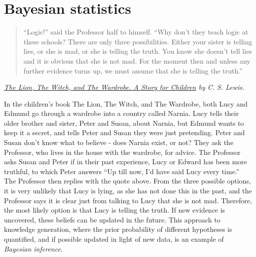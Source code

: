 \documentclass[
]{krantz}
\begin{document}
\hypertarget{bayes}{%
\chapter{Bayesian statistics}\label{bayes}}

\begin{quote}
``Logic!'' said the Professor half to himself. ``Why don't they teach logic at these schools? There are only three possibilities. Either your sister is telling lies, or she is mad, or she is telling the truth. You know she doesn't tell lies and it is obvious that she is not mad. For the moment then and unless any further evidence turns up, we must assume that she is telling the truth.''
\end{quote}

\emph{\href{https://gutenberg.ca/ebooks/lewiscs-thelionthewitchandthewardrobe/lewiscs-thelionthewitchandthewardrobe-00-h.html}{The Lion, The Witch, and The Wardrobe. A Story for Children} by C. S. Lewis.}

In the children's book The Lion, The Witch, and The Wardrobe, both Lucy and Edmund go through a wardrobe into a country called Narnia. Lucy tells their older brother and sister, Peter and Susan, about Narnia, but Edmund wants to keep it a secret, and tells Peter and Susan they were just pretending. Peter and Susan don't know what to believe - does Narnia exist, or not? They ask the Professor, who lives in the house with the wardrobe, for advice. The Professor asks Susan and Peter if in their past experience, Lucy or Edward has been more truthful, to which Peter answers ``Up till now, I'd have said Lucy every time.'' The Professor then replies with the quote above. From the three possible options, it is very unlikely that Lucy is lying, as she has not done this in the past, and the Professor says it is clear just from talking to Lucy that she is not mad. Therefore, the most likely option is that Lucy is telling the truth. If new evidence is uncovered, these beliefs can be updated in the future. This approach to knowledge generation, where the prior probability of different hypotheses is quantified, and if possible updated in light of new data, is an example of \emph{Bayesian inference}.
\end{document}
